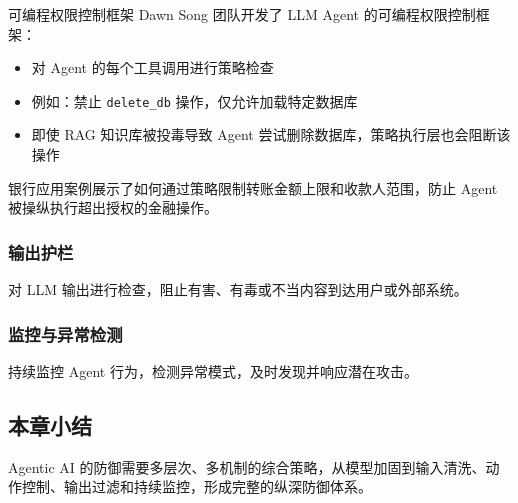 \begin{importantbox}{可编程权限控制框架}
Dawn Song 团队开发了 LLM Agent 的可编程权限控制框架：
\begin{itemize}
    \item 对 Agent 的每个工具调用进行策略检查
    \item 例如：禁止 \texttt{delete\_db} 操作，仅允许加载特定数据库
    \item 即使 RAG 知识库被投毒导致 Agent 尝试删除数据库，策略执行层也会阻断该操作
\end{itemize}
\end{importantbox}

银行应用案例展示了如何通过策略限制转账金额上限和收款人范围，防止 Agent 被操纵执行超出授权的金融操作。

\subsubsection{输出护栏}

对 LLM 输出进行检查，阻止有害、有毒或不当内容到达用户或外部系统。

\subsubsection{监控与异常检测}

持续监控 Agent 行为，检测异常模式，及时发现并响应潜在攻击。

\subsection{本章小结}

Agentic AI 的防御需要多层次、多机制的综合策略，从模型加固到输入清洗、动作控制、输出过滤和持续监控，形成完整的纵深防御体系。

